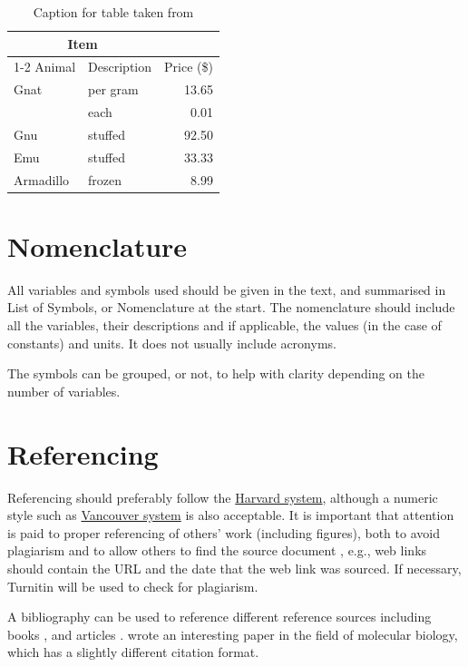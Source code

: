 \documentclass[a4paper,oneside,12pt]{book}
\begin{document}
\begin{table}[htb]
    \centering
\begin{tabular}{llr}  
\toprule
\multicolumn{2}{c}{Item} \\
\cmidrule(r){1-2}
Animal    & Description & Price (\$) \\
\midrule
Gnat      & per gram    & 13.65      \\
          &    each     & 0.01       \\
Gnu       & stuffed     & 92.50      \\
Emu       & stuffed     & 33.33      \\
Armadillo & frozen      & 8.99       \\
\bottomrule
\end{tabular}
    \caption{Caption for table taken from \cite{website:table}}
    \label{tab:my_label2}
\end{table}

\section{Nomenclature}
All variables and symbols used should be given in the text, and summarised in List of Symbols, or Nomenclature at the start. 
The nomenclature should include all the variables, their descriptions and if applicable, the values (in the case of constants) and units. It does not usually include acronyms. 

The symbols can be grouped, or not, to help with clarity depending on the number of variables.


\section{Referencing}
Referencing should preferably follow the \href{https://library.aru.ac.uk/referencing/harvard.htm}{Harvard system}, although a numeric style such as \href{https://en.wikipedia.org/wiki/Vancouver_system}{Vancouver system} is also acceptable. It is important that attention is paid to proper referencing of others' work (including figures), both to avoid plagiarism and to allow others to find the source document \citep{blackholes}, e.g., web links should contain the URL and the date that the web link was sourced. If necessary, Turnitin will be used to check for plagiarism.

A bibliography can be used to reference different reference sources including books \citep{book:goossens93}, and articles \citep{art:AbedonHymanThomas2003,art:greenwade93}. \citet{proc:Abedon1994} wrote an interesting paper in the field of molecular biology, which has a slightly different citation format.
\end{document}
